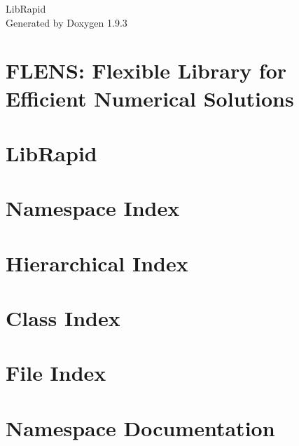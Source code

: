 \documentclass[twoside]{book}
\newcommand{\+}{\discretionary{\mbox{\scriptsize$\hookleftarrow$}}{}{}}
\newcommand{\clearemptydoublepage}{%
    \newpage{\pagestyle{empty}\cleardoublepage}%
  }
\begin{document}
  \raggedbottom
    \hypersetup{pageanchor=false,
                bookmarksnumbered=true,
                pdfencoding=unicode
               }
  \begin{titlepage}
  \vspace*{7cm}
  \begin{center}%
  {\Large Lib\+Rapid}\\
  \vspace*{1cm}
  {\large Generated by Doxygen 1.9.3}\\
  \end{center}
  \end{titlepage}
  \clearemptydoublepage
  \tableofcontents
  \clearemptydoublepage
  \hypersetup{pageanchor=true}
\chapter{FLENS\+: Flexible Library for Efficient Numerical Solutions}
\label{md_librapid_cxxblas__r_e_a_d_m_e}

\chapter{Lib\+Rapid}
\label{md_librapid__r_e_a_d_m_e}

\chapter{Namespace Index}

\chapter{Hierarchical Index}

\chapter{Class Index}

\chapter{File Index}

\chapter{Namespace Documentation}









\end{document}
